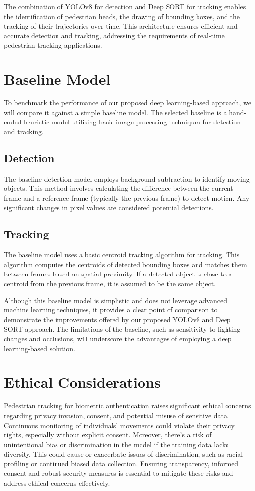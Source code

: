 \documentclass{article} %
\begin{document}
The combination of YOLOv8 for detection and Deep SORT for tracking enables the identification of pedestrian heads, the drawing of bounding boxes, and the tracking of their trajectories over time. This architecture ensures efficient and accurate detection and tracking, addressing the requirements of real-time pedestrian tracking applications.

\section{Baseline Model}
To benchmark the performance of our proposed deep learning-based approach, we will compare it against a simple baseline model. The selected baseline is a hand-coded heuristic model utilizing basic image processing techniques for detection and tracking.

\subsection{Detection}
The baseline detection model employs background subtraction to identify moving objects. This method involves calculating the difference between the current frame and a reference frame (typically the previous frame) to detect motion. Any significant changes in pixel values are considered potential detections.

\subsection{Tracking}
The baseline model uses a basic centroid tracking algorithm for tracking. This algorithm computes the centroids of detected bounding boxes and matches them between frames based on spatial proximity. If a detected object is close to a centroid from the previous frame, it is assumed to be the same object.

Although this baseline model is simplistic and does not leverage advanced machine learning techniques, it provides a clear point of comparison to demonstrate the improvements offered by our proposed YOLOv8 and Deep SORT approach. The limitations of the baseline, such as sensitivity to lighting changes and occlusions, will underscore the advantages of employing a deep learning-based solution.

\section{Ethical Considerations}
Pedestrian tracking for biometric authentication raises significant ethical concerns regarding privacy invasion, consent, and potential misuse of sensitive data. Continuous monitoring of individuals' movements could violate their privacy rights, especially without explicit consent. Moreover, there's a risk of unintentional bias or discrimination in the model if the training data lacks diversity. This could cause or exacerbate issues of discrimination, such as racial profiling or continued biased data collection. Ensuring transparency, informed consent and robust security measures is essential to mitigate these risks and address ethical concerns effectively. 
\end{document}
